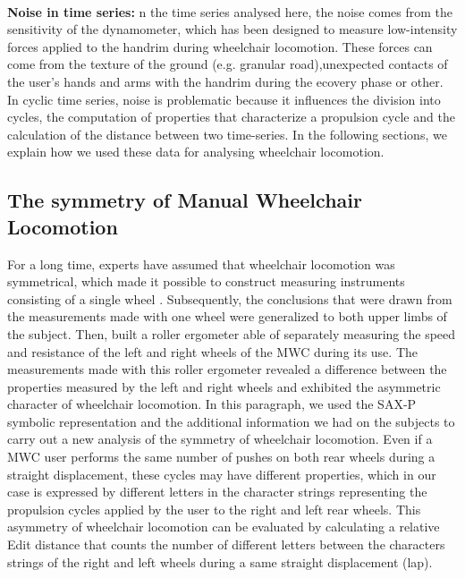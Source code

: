 \paragraph{}\textbf{Noise in time series:} n the time series analysed here, the noise comes from the sensitivity of the dynamometer, which has been designed to measure low-intensity forces applied to the handrim during wheelchair locomotion. These forces can come from the texture of the ground (e.g. granular road),unexpected contacts of the user’s hands and arms with the handrim during the ecovery phase or other. In cyclic time series, noise is problematic because it influences the division into cycles, the computation of properties that characterize a propulsion cycle and the calculation of the distance between two time-series. In the following sections, we explain how we used these data for analysing wheelchair locomotion. 

\subsection{The symmetry of Manual Wheelchair Locomotion}
For a long time, experts have assumed that wheelchair locomotion was symmetrical, which made it possible to construct measuring instruments consisting of a single wheel \cite{brouha1967continuous}. Subsequently, the conclusions that were drawn from the measurements made with one wheel were generalized to both upper limbs of the subject. Then, \cite{langbein1993research} built a roller ergometer able of separately measuring the speed and resistance of the left and right wheels of the MWC during its use. The measurements made with this roller ergometer revealed a difference between the properties measured by the left and right wheels and exhibited the asymmetric character of wheelchair locomotion. In this paragraph, we used the SAX-P symbolic representation and the additional information we had on the subjects to carry out a new analysis of the symmetry of wheelchair locomotion. 
Even if a MWC user performs the same number of pushes on both rear wheels during a straight displacement, these cycles may have different properties, which in our case is expressed by different letters in the character strings representing the propulsion cycles applied by the user to the right and left rear wheels. This asymmetry of wheelchair locomotion can be evaluated by calculating a relative Edit distance that counts the number of different letters between the characters strings of the right and left wheels during a same straight displacement (lap).

